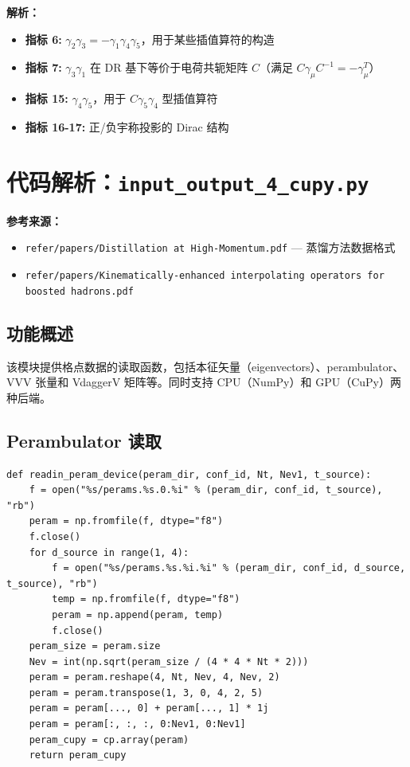 \documentclass[12pt,a4paper]{ctexart}
\begin{document}
\textbf{解析：}
\begin{itemize}
    \item \textbf{指标 6:} $\gamma_2\gamma_3 = -\gamma_1\gamma_4\gamma_5$，用于某些插值算符的构造
    \item \textbf{指标 7:} $\gamma_3\gamma_1$ 在 DR 基下等价于电荷共轭矩阵 $C$（满足 $C\gamma_\mu C^{-1} = -\gamma_\mu^T$）
    \item \textbf{指标 15:} $\gamma_4\gamma_5$，用于 $C\gamma_5\gamma_4$ 型插值算符
    \item \textbf{指标 16-17:} 正/负宇称投影的 Dirac 结构
\end{itemize}

\section{代码解析：\texttt{input\_output\_4\_cupy.py}}
\label{sec:io}

\textbf{参考来源：}
\begin{itemize}
    \item \texttt{refer/papers/Distillation at High-Momentum.pdf} — 蒸馏方法数据格式
    \item \texttt{refer/papers/Kinematically-enhanced interpolating operators for boosted hadrons.pdf}
\end{itemize}

\subsection{功能概述}

该模块提供格点数据的读取函数，包括本征矢量（eigenvectors）、perambulator、VVV 张量和 VdaggerV 矩阵等。同时支持 CPU（NumPy）和 GPU（CuPy）两种后端。

\subsection{Perambulator 读取}

\begin{lstlisting}[caption={读取 Perambulator（GPU 版本）}]
def readin_peram_device(peram_dir, conf_id, Nt, Nev1, t_source):
    f = open("%s/perams.%s.0.%i" % (peram_dir, conf_id, t_source), "rb")
    peram = np.fromfile(f, dtype="f8")
    f.close()
    for d_source in range(1, 4):
        f = open("%s/perams.%s.%i.%i" % (peram_dir, conf_id, d_source, t_source), "rb")
        temp = np.fromfile(f, dtype="f8")
        peram = np.append(peram, temp)
        f.close()
    peram_size = peram.size
    Nev = int(np.sqrt(peram_size / (4 * 4 * Nt * 2)))
    peram = peram.reshape(4, Nt, Nev, 4, Nev, 2)
    peram = peram.transpose(1, 3, 0, 4, 2, 5)
    peram = peram[..., 0] + peram[..., 1] * 1j
    peram = peram[:, :, :, 0:Nev1, 0:Nev1]
    peram_cupy = cp.array(peram)
    return peram_cupy
\end{lstlisting}
\end{document}
